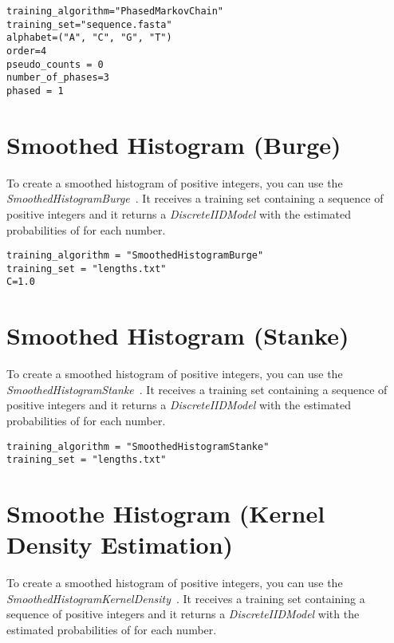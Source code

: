 \begin{Verbatim}[frame=single, label=train.txt]
training_algorithm="PhasedMarkovChain"
training_set="sequence.fasta"
alphabet=("A", "C", "G", "T")
order=4
pseudo_counts = 0
number_of_phases=3
phased = 1
\end{Verbatim}

\section{Smoothed Histogram (Burge)}

To create a smoothed histogram of positive integers, you can use the \textit{SmoothedHistogramBurge}~\cite{Burge1997}. It receives a training set containing a sequence of positive integers and it returns a \textit{DiscreteIIDModel} with the estimated probabilities of for each number.

\begin{Verbatim}[frame=single, label=train.txt]
training_algorithm = "SmoothedHistogramBurge"
training_set = "lengths.txt"
C=1.0
\end{Verbatim}

\section{Smoothed Histogram (Stanke)}


To create a smoothed histogram of positive integers, you can use the \textit{SmoothedHistogramStanke}~\cite{Stanke2003b}. It receives a training set containing a sequence of positive integers and it returns a \textit{DiscreteIIDModel} with the estimated probabilities of for each number.

\begin{Verbatim}[frame=single, label=train.txt]
training_algorithm = "SmoothedHistogramStanke"
training_set = "lengths.txt"
\end{Verbatim}


\section{Smoothe Histogram (Kernel Density Estimation)}

To create a smoothed histogram of positive integers, you can use the \textit{SmoothedHistogramKernelDensity}~\cite{Sheather2004}. It receives a training set containing a sequence of positive integers and it returns a \textit{DiscreteIIDModel} with the estimated probabilities of for each number.


